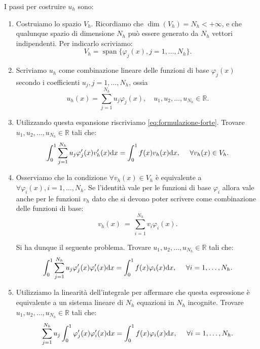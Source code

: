 I passi per costruire $\displaystyle u_{h}$ sono:
\begin{enumerate}
\item Costruiamo lo spazio $V_{h}$. Ricordiamo che $\operatorname{dim}( V_{h}) =N_{h} < +\infty $, e che qualunque spazio di dimensione $\displaystyle N_{h}$ può essere generato da $\displaystyle N_{h}$ vettori indipendenti.
Per indicarlo scriviamo:
\begin{equation*}
V_{h} =\operatorname{span}\{\varphi _{j}(x) ,j=1, \dotsc, N_{h}\}.
\end{equation*}
\item Scriviamo $\displaystyle u_{h}$ come combinazione lineare delle funzioni di base $\displaystyle \varphi _{j}(x)$ secondo i coefficienti $u_j ,j=1,\dotsc ,N_{h}$, ossia
\begin{equation*}
u_{h}(x) =\sum ^{N_{h}}_{j=1} u_{j} \varphi _{j}(x), \quad u_{1} ,u_{2} ,\dotsc ,u_{N_h} \in \mathbb{R} .
\end{equation*}
\item Utilizzando questa espansione riscriviamo \eqref{eq:formulazione-forte}. Trovare $u_{1}, u_{2}, \dotsc, u_{N_h} \in \mathbb{R}$ tali che:
\begin{equation*}
\int\nolimits ^{1}_{0}\sum\limits ^{N_{h}}_{j=1} u_{j} \varphi '_{j}(x) v'_{h}(x) \mathrm d x=\int\nolimits ^{1}_{0} f(x) v_{h}(x) \mathrm d x,\ \ \ \ \forall v_{h}(x) \in V_{h}.
\end{equation*}
\item Osserviamo che la condizione $\displaystyle \forall v_{h}(x) \in V_{h}$ è equivalente a $\displaystyle \forall \varphi _{i}(x) ,i=1,\dotsc ,N_{h}$. Se l'identità vale per le funzioni di base $\displaystyle \varphi _{i}$ allora vale anche per le funzioni $\displaystyle v_{h}$ dato che si devono poter scrivere come combinazione delle funzioni di base:
\begin{equation*}
v_{h}(x) \ =\ \sum\limits ^{N_{h}}_{i=1} v_{i} \varphi _{i}(x).
\end{equation*}

Si ha dunque il seguente problema. Trovare $u_{1}, u_{2}, \dotsc, u_{N_h} \in \mathbb{R}$ tali che:
\begin{equation*}
\int\nolimits ^{1}_{0}\sum\limits ^{N_{h}}_{j=1} u_{j} \varphi '_{j}(x) \varphi '_{i}(x) \mathrm d x=\int\nolimits ^{1}_{0} f(x) \varphi _{i}(x) \mathrm d x,\ \ \ \ \forall i=1,\dotsc ,N_{h}.
\end{equation*}
\item Utilizziamo la linearità dell'integrale per affermare che questa espressione è equivalente a un sistema lineare di $N_{h}$ equazioni in $\displaystyle N_{h}$ incognite.
Trovare $u_{1}, u_{2}, \dotsc, u_{N_h} \in \mathbb{R}$ tali che:
\begin{equation*}
\sum\limits ^{N_{h}}_{j=1} u_{j}\int\nolimits ^{1}_{0} \varphi '_{j}(x) \varphi '_{i}(x) \mathrm d x=\int\nolimits ^{1}_{0} f(x) \varphi _{i}(x) \mathrm d x,\ \ \ \ \forall i=1,\dotsc ,N_{h}.
\end{equation*}


\end{enumerate}

